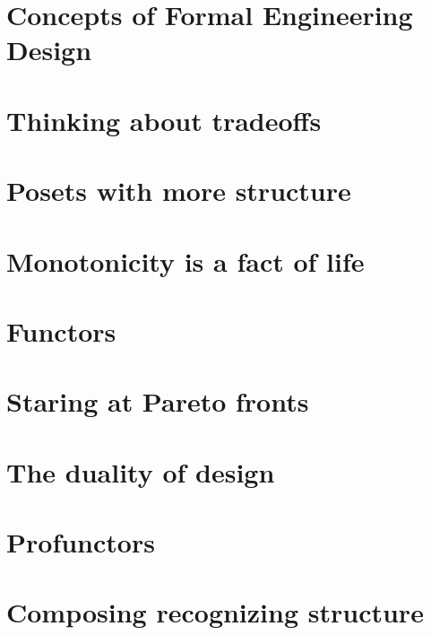 \documentclass[paper=6in:9in,pagesize=pdftex,
 headinclude=off,footinclude=on,11pt,twoside]{scrbook}
\begin{document}
\chapter{Concepts of  Formal Engineering Design}

\clearpage

\chapter{Thinking about tradeoffs}

\clearpage

\chapter{Posets with more structure}

\clearpage

\chapter{Monotonicity is a fact of life}

\clearpage

\chapter{Functors}

\clearpage

\chapter{Staring at Pareto fronts}

\clearpage

\chapter{The duality of design}

\clearpage

\chapter{Profunctors}

\clearpage

\chapter{Composing recognizing structure}

\clearpage
\end{document}
